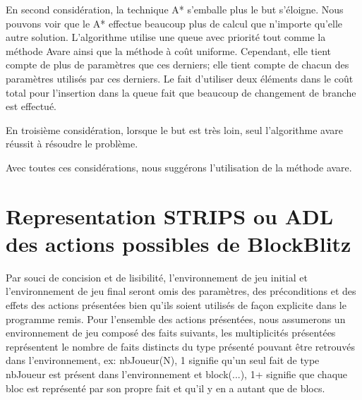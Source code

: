 \documentclass[12pt,english,frenchb,letterpaper]{article}
\begin{document}
En second considération, la technique A* s'emballe plus le but s'éloigne. Nous pouvons voir que le A* effectue beaucoup plus de calcul que n'importe qu'elle autre solution. L'algorithme utilise une queue avec priorité tout comme la méthode Avare ainsi que la méthode à coût uniforme. Cependant, elle tient compte de plus de paramètres que ces derniers; elle tient compte de chacun des paramètres utilisés par ces derniers. Le fait d'utiliser deux éléments dans le coût total pour l'insertion dans la queue fait que beaucoup de changement de branche est effectué.

En troisième considération, lorsque le but est très loin, seul l'algorithme avare réussit à résoudre le problème.

Avec toutes ces considérations, nous suggérons l'utilisation de la méthode avare.



\section{Representation STRIPS ou ADL des actions possibles de BlockBlitz}
Par souci de concision et de lisibilité, l'environnement de jeu initial et l'environnement de jeu final seront omis des paramètres, des préconditions et des effets des actions présentées bien qu'ils soient utilisés de fa\c con explicite dans le programme remis.  Pour l'ensemble des actions présentées, nous assumerons un environnement de jeu composé des faits suivants, les multiplicités présentées représentent le nombre de faits distincts du type présenté pouvant être retrouvés dans l'environnement, ex: nbJoueur(N), 1 signifie qu'un seul fait de type nbJoueur est présent dans l'environnement et block(...), 1+ signifie que chaque bloc est représenté par son propre fait et qu'il y en a autant que de blocs.
\end{document}
